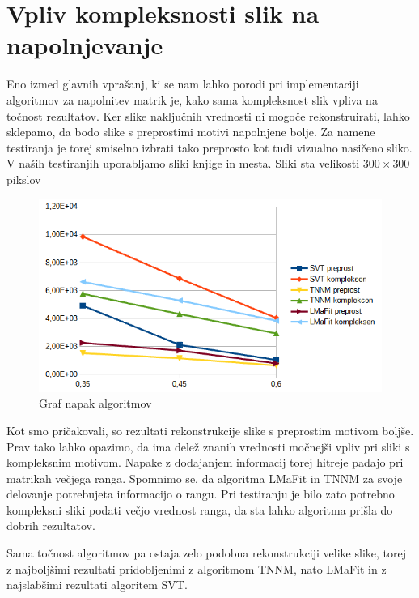 \section{Vpliv kompleksnosti slik na napolnjevanje}
Eno izmed glavnih vprašanj, ki se nam lahko porodi pri implementaciji algoritmov za napolnitev matrik je, kako sama kompleksnost slik vpliva na točnost rezultatov. Ker slike naključnih vrednosti ni mogoče rekonstruirati, lahko sklepamo, da bodo slike s preprostimi motivi napolnjene bolje. Za namene testiranja je torej smiselno izbrati tako preprosto kot tudi vizualno nasičeno sliko. V naših testiranjih uporabljamo sliki knjige in mesta. Sliki sta velikosti $300 \times 300$ pikslov

\begin{figure}[!ht]
    \centering
    \includegraphics[width=\linewidth]{Poglavja/Slike/kompleksna grayscale 300/kompleksnost.png}
    \caption{Graf napak algoritmov}
\end{figure}

Kot smo pričakovali, so rezultati rekonstrukcije slike s preprostim motivom boljše. Prav tako lahko opazimo, da ima delež znanih vrednosti močnejši vpliv pri sliki s kompleksnim motivom. Napake z dodajanjem informacij torej hitreje padajo pri matrikah večjega ranga. Spomnimo se, da algoritma LMaFit in TNNM za svoje delovanje potrebujeta informacijo o rangu. Pri testiranju je bilo zato potrebno kompleksni sliki podati večjo vrednost ranga, da sta lahko algoritma prišla do dobrih rezultatov.

Sama točnost algoritmov pa ostaja zelo podobna rekonstrukciji velike slike, torej z najboljšimi rezultati pridobljenimi z algoritmom TNNM, nato LMaFit in z najslabšimi rezultati algoritem SVT.

